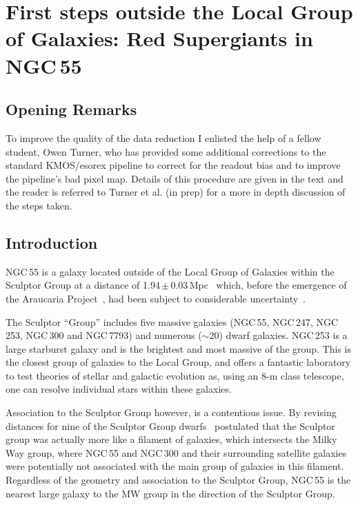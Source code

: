 \cleardoublepage
\chapter{First steps outside the Local Group of Galaxies: Red Supergiants in NGC\,55}
\label{ch:ngc55}

\renewcommand{\headrulewidth}{1pt}

\section{Opening Remarks} %
\label{sec:ngc55open}

To improve the quality of the data reduction I enlisted the help of a fellow student, Owen Turner, who has provided some additional corrections to the standard KMOS/esorex pipeline to correct for the readout bias and to improve the pipeline's bad pixel map.
Details of this procedure are given in the text and the reader is referred to Turner et al. (in prep) for a more in depth discussion of the steps taken.

\section{Introduction} %
\label{sec:ngc55intro}

NGC\,55 is a galaxy located outside of the Local Group of Galaxies within the Sculptor Group at a distance of 1.94\,$\pm$\,0.03\,Mpc~\citep{2006AJ....132.2556P,2008ApJ...672..266G} which, before the emergence of the Araucaria Project~\citep{2005Msngr.121...23G}, had been subject to considerable uncertainty~\citep[e.g.][]{1987ApJ...323...79P,2006A&A...455..891V}.

The Sculptor ``Group'' includes five massive galaxies (NGC\,55, NGC\,247, NGC\,253, NGC\,300 and NGC\,7793) and numerous ($\sim$20) dwarf galaxies.
NGC\,253 is a large starburst galaxy and is the brightest and most massive of the group. This is the closest group of galaxies to the Local Group, and offers a fantastic laboratory to test theories of stellar and galactic evolution as, using an 8-m class telescope, one can resolve individual stars within these galaxies.

Association to the Sculptor Group however, is a contentious issue.
By revising distances for nine of the Sculptor Group dwarfs~\cite{2003A&A...404...93K} postulated that the Sculptor group was actually more like a filament of galaxies, which intersects the Milky Way group, where NGC\,55 and NGC\,300 and their surrounding satellite galaxies were potentially not associated with the main group of galaxies in this filament.
Regardless of the geometry and association to the Sculptor Group, NGC\,55 is the nearest large galaxy to the MW group in the direction of the Sculptor Group.


